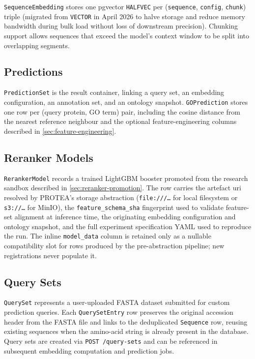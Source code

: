\texttt{SequenceEmbedding} stores one pgvector \texttt{HALFVEC} per
(\texttt{sequence}, \texttt{config}, \texttt{chunk}) triple (migrated from
\texttt{VECTOR} in April 2026 to halve storage and reduce memory bandwidth during
bulk load without loss of downstream precision). Chunking support allows sequences
that exceed the model's context window to be split into overlapping segments.

\subsection{Predictions}
\label{subsec:dm-predictions}

\texttt{PredictionSet} is the result container, linking a query set, an embedding
configuration, an annotation set, and an ontology snapshot.
\texttt{GOPrediction} stores one row per (query protein, GO term) pair, including
the cosine distance from the nearest reference neighbour and the optional
feature-engineering columns described in \cref{sec:feature-engineering}.

\subsection{Reranker Models}
\label{subsec:dm-reranker}

\texttt{RerankerModel} records a trained LightGBM booster promoted from the
research sandbox described in \cref{sec:reranker-promotion}. The row carries
the artefact \gls{uri} resolved by PROTEA's storage abstraction
(\texttt{file:///\ldots} for local filesystem or \texttt{s3://\ldots} for
MinIO), the \texttt{feature\_schema\_sha} fingerprint used to validate
feature-set alignment at inference time, the originating embedding
configuration and ontology snapshot, and the full experiment specification
YAML used to reproduce the run. The inline \texttt{model\_data} column is
retained only as a nullable compatibility slot for rows produced by the
pre-abstraction pipeline; new registrations never populate it.

\subsection{Query Sets}
\label{subsec:dm-querysets}

\texttt{QuerySet} represents a user-uploaded FASTA dataset submitted for custom
prediction queries. Each \texttt{QuerySetEntry} row preserves the original
accession header from the FASTA file and links to the deduplicated
\texttt{Sequence} row, reusing existing sequences when the amino-acid string is
already present in the database. Query sets are created via
\texttt{POST /query-sets} and can be referenced in subsequent embedding
computation and prediction jobs.

